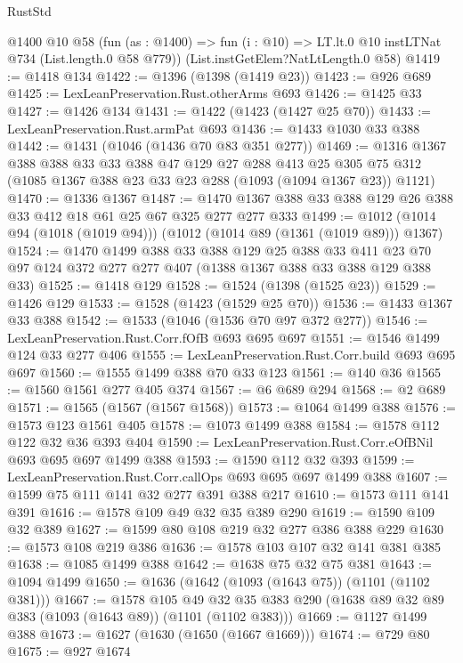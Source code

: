 \begin{lexlean}{RustStd}
\begin{coremodule}
    @1400
    @10
    @58
    (fun (as : @1400) => fun (i : @10) => LT.lt.{0} @10 instLTNat @734 (List.length.{0} @58 @779))
    (List.instGetElem?NatLtLength.{0} @58)
@1419 := @1418 @134
@1422 := @1396 (@1398 (@1419 @23))
@1423 := @926 @689
@1425 := LexLeanPreservation.Rust.otherArms @693
@1426 := @1425 @33
@1427 := @1426 @134
@1431 := @1422 (@1423 (@1427 @25 @70))
@1433 := LexLeanPreservation.Rust.armPat @693
@1436 := @1433 @1030 @33 @388
@1442 := @1431 (@1046 (@1436 @70 @83 @351 @277))
@1469 := @1316
    @1367
    @388
    @388
    @33
    @33
    @388
    @47
    @129
    @27
    @288
    @413
    @25
    @305
    @75
    @312
    (@1085 @1367 @388 @23 @33 @23 @288 (@1093 (@1094 @1367 @23)) @1121)
@1470 := @1336 @1367
@1487 := @1470 @1367 @388 @33 @388 @129 @26 @388 @33 @412 @18 @61 @25 @67 @325 @277 @277 @333
@1499 := @1012 (@1014 @94 (@1018 (@1019 @94))) (@1012 (@1014 @89 (@1361 (@1019 @89))) @1367)
@1524 := @1470
    @1499
    @388
    @33
    @388
    @129
    @25
    @388
    @33
    @411
    @23
    @70
    @97
    @124
    @372
    @277
    @277
    @407
    (@1388 @1367 @388 @33 @388 @129 @388 @33)
@1525 := @1418 @129
@1528 := @1524 (@1398 (@1525 @23))
@1529 := @1426 @129
@1533 := @1528 (@1423 (@1529 @25 @70))
@1536 := @1433 @1367 @33 @388
@1542 := @1533 (@1046 (@1536 @70 @97 @372 @277))
@1546 := LexLeanPreservation.Rust.Corr.fOfB @693 @695 @697
@1551 := @1546 @1499 @124 @33 @277 @406
@1555 := LexLeanPreservation.Rust.Corr.build @693 @695 @697
@1560 := @1555 @1499 @388 @70 @33 @123
@1561 := @140 @36
@1565 := @1560 @1561 @277 @405 @374
@1567 := @6 @689 @294
@1568 := @2 @689
@1571 := @1565 (@1567 (@1567 @1568))
@1573 := @1064 @1499 @388
@1576 := @1573 @123 @1561 @405
@1578 := @1073 @1499 @388
@1584 := @1578 @112 @122 @32 @36 @393 @404
@1590 := LexLeanPreservation.Rust.Corr.eOfBNil @693 @695 @697 @1499 @388
@1593 := @1590 @112 @32 @393
@1599 := LexLeanPreservation.Rust.Corr.callOps @693 @695 @697 @1499 @388
@1607 := @1599 @75 @111 @141 @32 @277 @391 @388 @217
@1610 := @1573 @111 @141 @391
@1616 := @1578 @109 @49 @32 @35 @389 @290
@1619 := @1590 @109 @32 @389
@1627 := @1599 @80 @108 @219 @32 @277 @386 @388 @229
@1630 := @1573 @108 @219 @386
@1636 := @1578 @103 @107 @32 @141 @381 @385
@1638 := @1085 @1499 @388
@1642 := @1638 @75 @32 @75 @381
@1643 := @1094 @1499
@1650 := @1636 (@1642 (@1093 (@1643 @75)) (@1101 (@1102 @381)))
@1667 := @1578
    @105
    @49
    @32
    @35
    @383
    @290
    (@1638 @89 @32 @89 @383 (@1093 (@1643 @89)) (@1101 (@1102 @383)))
@1669 := @1127 @1499 @388
@1673 := @1627 (@1630 (@1650 (@1667 @1669)))
@1674 := @729 @80
@1675 := @927 @1674

\end{coremodule}
\end{lexlean}
